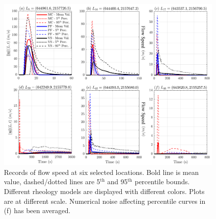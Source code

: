 \documentclass{article}
\begin{document}
\begin{figure}[H]
         \centering
        \includegraphics[width=1\textwidth]{BAF_VolcanDeColima/LocalMeasurments/Velocity_Col.png}
        \caption{Records of flow speed at six selected locations. Bold line is mean value, dashed/dotted lines are 5$^{\mathrm{th}}$ and 95$^{\mathrm{th}}$ percentile bounds. Different rheology models are displayed with different colors. Plots are at different scale. Numerical noise affecting percentile curves in (f) has been averaged.}
        \label{fig:Colima-Vel}
\end{figure}
\newpage
\end{document}
